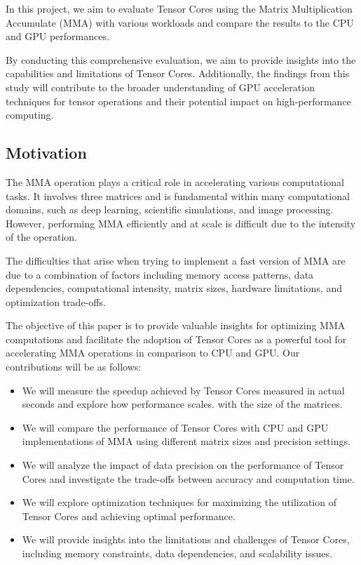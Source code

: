 \documentclass[conference]{IEEEtran}
\begin{document}
In this project, we aim to evaluate Tensor Cores using the Matrix Multiplication Accumulate (MMA) with various 
workloads and compare the results to the CPU and GPU performances. 

By conducting this comprehensive evaluation, we aim to provide insights into the capabilities and 
limitations of Tensor Cores. Additionally, the findings from this study will contribute to the 
broader understanding of GPU acceleration techniques for tensor operations and their potential 
impact on high-performance computing.

\subsection{Motivation}\label{sec:Motivation}

The MMA operation plays a critical role in accelerating various computational tasks.
It involves three matrices and is fundamental within many computational domains, 
such as deep learning, scientific simulations, and image processing. However, performing MMA 
efficiently and at scale is difficult due to the intensity of the operation. 

The difficulties that arise when trying to implement a fast version of MMA are due to 
a combination of factors including memory access patterns, data dependencies, 
computational intensity, matrix sizes, hardware limitations, and optimization trade-offs.

The objective of this paper is to provide valuable insights for optimizing MMA computations
and facilitate the adoption of Tensor Cores as a powerful tool for accelerating MMA 
operations in comparison to CPU and GPU. Our contributions will be as follows:
\begin{itemize}
  \item We will measure the speedup achieved by Tensor Cores measured in actual seconds and explore how 
  performance scales.
  with the size of the matrices.

  \item We will compare the performance of Tensor Cores with CPU and GPU implementations of MMA 
  using different matrix sizes and precision settings.
  
  \item We will analyze the impact of data precision on the performance of Tensor Cores and 
  investigate the trade-offs between accuracy and computation time.
  
  \item We will explore optimization techniques for maximizing the utilization of Tensor Cores 
  and achieving optimal performance.
  
  \item We will provide insights into the limitations and challenges of Tensor Cores, 
  including memory constraints, data dependencies, and scalability issues.
  
  \end{itemize}
  
\end{document}
